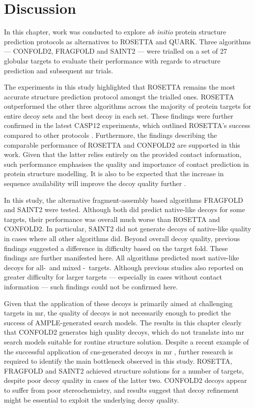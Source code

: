 \section{Discussion}
In this chapter, work was conducted to explore \textit{ab initio} protein structure prediction protocols as alternatives to ROSETTA and QUARK. Three algorithms --- CONFOLD2, FRAGFOLD and SAINT2 --- were trialled on a set of 27 globular targets to evaluate their performance with regards to structure prediction and subsequent \gls{mr} trials.

The experiments in this study highlighted that ROSETTA remains the most accurate structure prediction protocol amongst the trialled ones. ROSETTA outperformed the other three algorithms across the majority of protein targets for entire decoy sets and the best decoy in each set. These findings were further confirmed in the latest CASP12 experiments, which outlined ROSETTA's success compared to other protocols \cite{Ovchinnikov2017-wp,Abriata2018-lu}. Furthermore, the findings describing the comparable performance of ROSETTA and CONFOLD2 \cite{Adhikari2018-lj,Michel2017-xh} are supported in this work. Given that the latter relies entirely on the provided contact information, such performance emphasises the quality and importance of contact prediction in protein structure modelling. It is also to be expected that the increase in sequence availability will improve the decoy quality further \cite{Abriata2018-lu,Schaarschmidt2018-mh}.

In this study, the alternative fragment-assembly based algorithms FRAGFOLD and SAINT2 were tested. Although both did predict native-like decoys for some targets, their performance was overall much worse than ROSETTA and CONFOLD2. In particular, SAINT2 did not generate decoys of native-like quality in cases where all other algorithms did. Beyond overall decoy quality, previous findings suggested a difference in difficulty based on the target fold. These findings are further manifested here. All algorithms predicted most native-like decoys for all-\textalpha\ and mixed \textalpha-\textbeta\ targets. Although previous studies also reported on greater difficulty for larger targets --- especially in cases without contact information --- such findings could not be confirmed here.

Given that the application of these decoys is primarily aimed at challenging targets in \gls{mr}, the quality of decoys is not necessarily enough to predict the success of AMPLE-generated search models. The results in this chapter clearly that CONFOLD2 generates high quality decoys, which do not translate into \gls{mr} search models suitable for routine structure solution. Despite a recent example of the successful application of \gls{cns}-generated decoys in \gls{mr} \cite{Sjodt2018-zq}, further research is required to identify the main bottleneck observed in this study. ROSETTA, FRAGFOLD and SAINT2 achieved structure solutions for a number of targets, despite poor decoy quality in cases of the latter two. CONFOLD2 decoys appear to suffer from poor stereochemistry, and results suggest that decoy refinement might be essential to exploit the underlying decoy quality.

